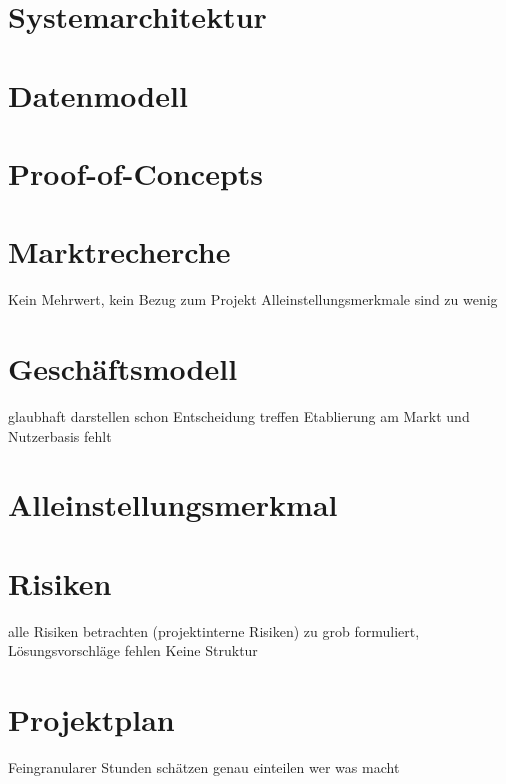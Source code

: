 \documentclass[a4paper, 12pt]{report}
\begin{document}

\chapter{Systemarchitektur}


\chapter{Datenmodell}


\chapter{Proof-of-Concepts}


\chapter{Marktrecherche}

Kein Mehrwert, kein Bezug zum Projekt
Alleinstellungsmerkmale sind zu wenig


\chapter{Geschäftsmodell}

glaubhaft darstellen
schon Entscheidung treffen
Etablierung am Markt und Nutzerbasis fehlt


\chapter{Alleinstellungsmerkmal}


\chapter{Risiken}

alle Risiken betrachten (projektinterne Risiken)
zu grob formuliert, Lösungsvorschläge fehlen
Keine Struktur


\chapter{Projektplan}

Feingranularer
Stunden schätzen
genau einteilen wer was macht

\end{document}
